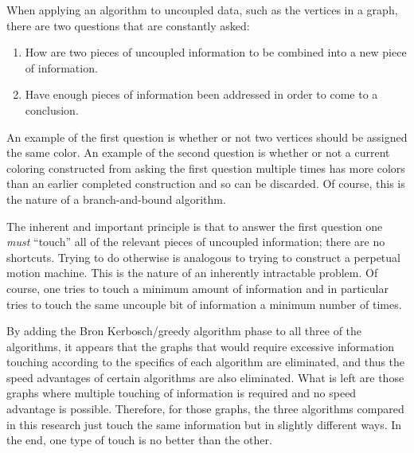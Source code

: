 When applying an algorithm to uncoupled data, such as the vertices in a graph, there are two questions that are
constantly asked:
\begin{enumerate}
\item How are two pieces of uncoupled information to be combined into a new piece of information.
\item Have enough pieces of information been addressed in order to come to a conclusion.
\end{enumerate}
An example of the first question is whether or not two vertices should be assigned the same color.  An example of
the second question is whether or not a current coloring constructed from asking the first question multiple times
has more colors than an earlier completed construction and so can be discarded.  Of course, this is the nature of a
branch-and-bound algorithm.

The inherent and important principle is that to answer the first question one \emph{must} ``touch'' all of the
relevant pieces of uncoupled information; there are no shortcuts.  Trying to do otherwise is analogous to trying to
construct a perpetual motion machine.  This is the nature of an inherently intractable problem.  Of course, one
tries to touch a minimum amount of information and in particular tries to touch the same uncouple bit of information
a minimum number of times.

By adding the Bron Kerbosch/greedy algorithm phase to all three of the algorithms, it appears that the graphs that
would require excessive information touching according to the specifics of each algorithm are eliminated, and thus
the speed advantages of certain algorithms are also eliminated.  What is left are those graphs where multiple
touching of information is required and no speed advantage is possible.  Therefore, for those graphs, the three
algorithms compared in this research just touch the same information but in slightly different ways.  In the end,
one type of touch is no better than the other.
